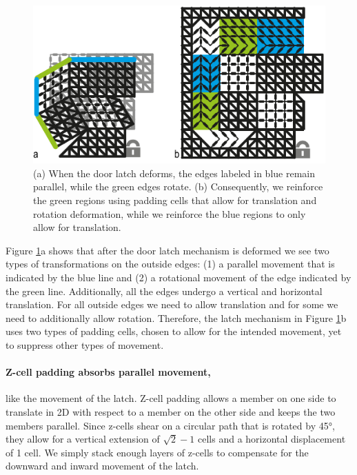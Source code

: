 \begin{figure} [!h]
    \includegraphics[width=\textwidth]{chapters/metamaterial-mechanisms-FIG/17-padding-movement.pdf}
    \caption[Short figure name.]{(a) When the door latch deforms, the edges labeled in blue remain parallel, while the green edges rotate. (b) Consequently, we reinforce the green regions using padding cells that allow for translation and rotation deformation, while we reinforce the blue regions to only allow for translation. 
    \label{fig:17-padding-movement}}
\end{figure}

Figure \ref{fig:17-padding-movement}a shows that after the door latch mechanism is deformed we see two types of transformations on the outside edges: (1) a parallel movement that is indicated by the blue line and (2) a rotational movement of the edge indicated by the green line. Additionally, all the edges undergo a vertical and horizontal translation. For all outside edges we need to allow translation and for some we need to additionally allow rotation. Therefore, the latch mechanism in Figure \ref{fig:17-padding-movement}b uses two types of padding cells, chosen to allow for the intended movement, yet to suppress other types of movement.

\paragraph{Z-cell padding absorbs parallel movement,} like the movement of the latch. Z-cell padding allows a member on one side to translate in 2D with respect to a member on the other side and keeps the two members parallel. Since z-cells shear on a circular path that is rotated by 45°, they allow for a vertical extension of $\sqrt{2}-1$ cells and a horizontal displacement of 1 cell. We simply stack enough layers of z-cells to compensate for the downward and inward movement of the latch.

